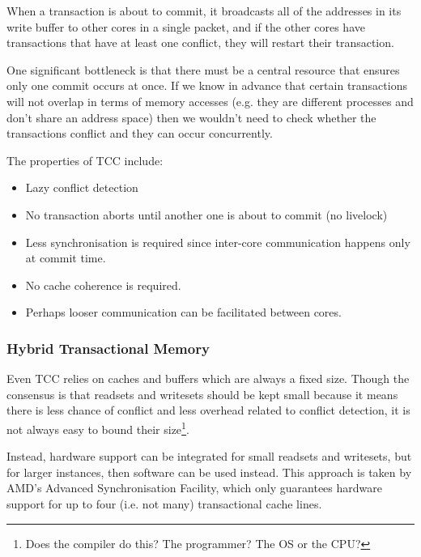 When a transaction is about to commit, it broadcasts all of the
addresses in its write buffer to other cores in a single packet, and
if the other cores have transactions that have at least one conflict,
they will restart their transaction.


One significant bottleneck is that there must be a central resource
that ensures only one commit occurs at once. If we know in advance
that certain transactions will not overlap in terms of memory accesses
(e.g. they are different processes and don't share an address space)
then we wouldn't need to check whether the transactions conflict and
they can occur concurrently.

The properties of TCC include:

\begin{itemize}
\item Lazy conflict detection
\item No transaction aborts until another one is about to commit (no livelock)
\item Less synchronisation is required since inter-core communication
happens only at commit time.
\item No cache coherence is required.
\item Perhaps looser communication can be facilitated between cores.
\end{itemize}

\subsubsection{Hybrid Transactional Memory}

Even TCC relies on caches and buffers which are always a fixed
size. Though the consensus is that readsets and writesets should be
kept small because it means there is less chance of conflict and less
overhead related to conflict detection, it is not always easy to bound
their size\footnote{Does the compiler do this? The programmer? The OS
or the CPU?}.

Instead, hardware support can be integrated for small readsets and
writesets, but for larger instances, then software can be used
instead. This approach is taken by AMD's Advanced Synchronisation
Facility, which only guarantees hardware support for up to four
(i.e. not many) transactional cache lines.

